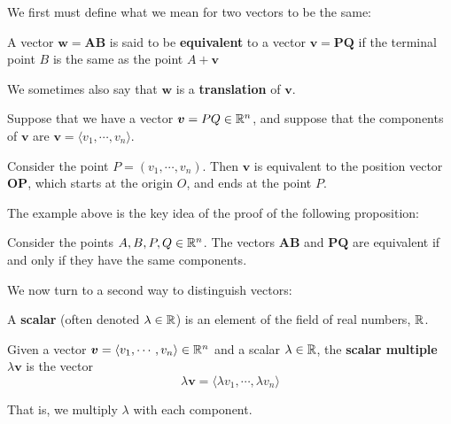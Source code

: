 We first must define what we mean for two vectors to be the same:


\begin{definition}

    A vector $\bm{w} = \bm{AB}$ is said to be \textbf{equivalent} to a vector $\bm{v} = \bm{PQ}$ if the terminal point $B$ is the same as the point $A + \bm{v}$
    
    We sometimes also say that $\bm{w}$ is a \textbf{translation} of $\bm{v}$.
    
\end{definition}

\begin{example}
    Suppose that we have a vector $\bm{v} = PQ \in \mathbb{R}^n$, and suppose that the components of $\bm{v}$ are $\bm{v} = \langle v_1, \cdots, v_n \rangle$.
    
    Consider the point $P = (v_1, \cdots, v_n)$.  Then $\bm{v}$ is equivalent to the position vector $\bm{OP}$, which starts at the origin $O$, and ends at the point $P$.
\end{example}


The example above is the key idea of the proof of the following proposition:

\begin{proposition}
    Consider the points $A, B, P, Q \in \mathbb{R}^n$.  The vectors $\bm{AB}$ and $\bm{PQ}$ are equivalent if and only if they have the same components.
\end{proposition}











We now turn to a second way to distinguish vectors:



\begin{definition}\label{scalar}
A \textbf{scalar} (often denoted $\lambda \in \mathbb{R}$) is an element of the field of real numbers, $\mathbb{R}$.
\end{definition}

    \begin{definition}
    Given a vector $\bm{v} = \langle v_1, \cdots , v_n\rangle \in \mathbb{R}^n$ and a scalar $\lambda \in \mathbb{R}$, the \textbf{scalar multiple}  $\lambda \bm{v}$ is the vector $$\lambda \bm{v} = \langle \lambda v_1, \cdots, \lambda v_n \rangle$$
    
    That is, we multiply $\lambda$ with each component.
  \end{definition}


